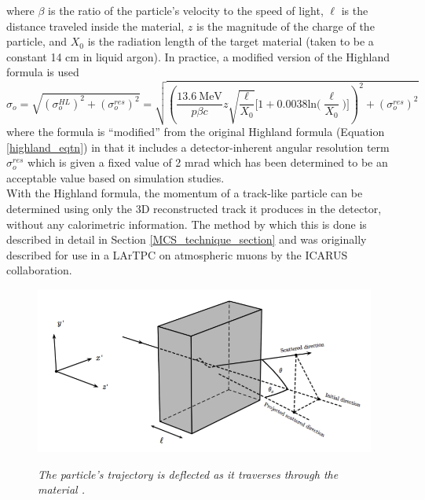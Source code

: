 \documentclass[a4paper,11pt]{article}
\begin{document}
\noindent where $\beta$ is the ratio of the particle's velocity to the speed of light, $\ell$ is the distance traveled inside the material, $z$ is the magnitude of the charge of the particle, and $X_0$ is the radiation length of the target material (taken to be a constant 14 cm in liquid argon). In practice, a modified version of the Highland formula is used
\begin{equation}\label{modified_highland_eqtn}
\sigma_{o} = \sqrt{ (\sigma_o^{HL})^2 + (\sigma_o^{res})^2} = \sqrt{ (\frac{13.6\  \text{MeV}}{p\beta c}z\sqrt{\frac{\ell}{X_0}}\Big[1+0.0038\text{ln}\Big(\frac{\ell}{X_0}\Big)\Big])^2 + (\sigma_o^{res})^2 }
\end{equation}
where the formula is ``modified'' from the original Highland formula (Equation \ref{highland_eqtn}) in that it includes a detector-inherent angular resolution term $\sigma_o^{res}$ which is given a fixed value of 2 mrad which has been determined to be an acceptable value based on simulation studies.\\


With the Highland formula, the momentum of a track-like particle can be determined using only the 3D reconstructed track it produces in the detector, without any calorimetric information. The method by which this is done is described in detail in Section \ref{MCS_technique_section} and was originally described for use in a LArTPC on atmospheric muons by the ICARUS collaboration\cite{icarus_mcs_paper}.

\begin{figure}[ht!]
\centering
	\includegraphics[width=0.5\linewidth]{Figures/static_figs/mcs_nocap.png} \\
\caption{\textit{The particle's trajectory is deflected as it traverses through the material \cite{leonidas1}.}}\label{mcs_nocap_fig}
\end{figure}
\end{document}
